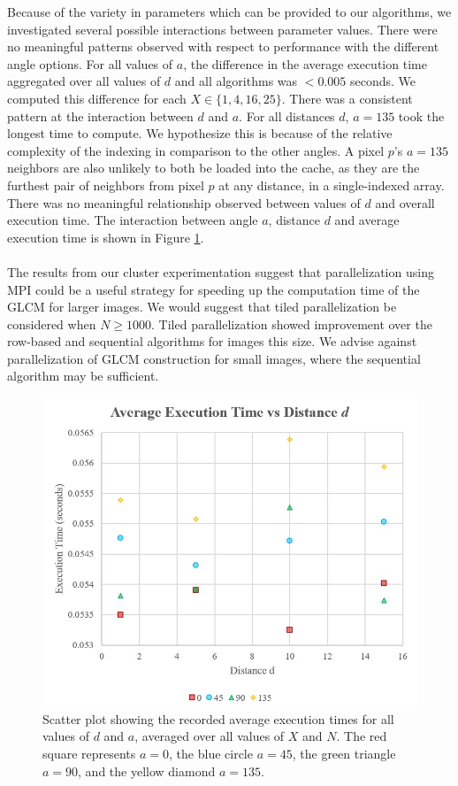 \documentclass{article}
\begin{document}
        Because of the variety in parameters which can be provided to our algorithms, we investigated several possible interactions between parameter values. There were no meaningful patterns observed with respect to performance with the different angle options. For all values of $a$, the difference in the average execution time aggregated over all values of $d$ and all algorithms was $< 0.005$ seconds. We computed this difference for each $X \in \{1, 4, 16, 25\}$. There was a consistent pattern at the interaction between $d$ and $a$. For all distances $d$, $a = 135$ took the longest time to compute. We hypothesize this is because of the relative complexity of the indexing in comparison to the other angles. A pixel $p$'s $a = 135$ neighbors are also unlikely to both be loaded into the cache, as they are the furthest pair of neighbors from pixel $p$ at any distance, in a single-indexed array. There was no meaningful relationship observed between values of $d$ and overall execution time. The interaction between angle $a$, distance $d$ and average execution time is shown in Figure \ref{fig:dist}. \\ \\ 
        The results from our cluster experimentation suggest that parallelization using MPI could be a useful strategy for speeding up the computation time of the GLCM for larger images. We would suggest that tiled parallelization be considered when $N \geq 1000$. Tiled parallelization showed improvement over the row-based and sequential algorithms for images this size. We advise against parallelization of GLCM construction for small images, where the sequential algorithm may be sufficient.   
     \begin{figure}
      \includegraphics[width=\linewidth]{distangle.jpg}
      \caption{Scatter plot showing the recorded average execution times for all values of $d$ and $a$, averaged over all values of $X$ and $N$. The red square represents $a = 0$, the blue circle $a = 45$, the green triangle $a = 90$, and the yellow diamond $a = 135$. }
      \label{fig:dist}
    \end{figure}
\end{document}

